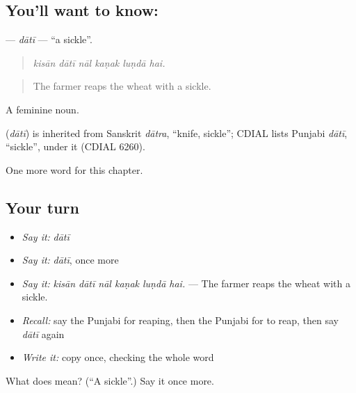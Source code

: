 \subsection*{You'll want to know: }
\textbf{} — \emph{dātī} — \textquotedblleft{}a sickle\textquotedblright{}.

\begin{quote}
     
\end{quote}

\begin{quote}
\emph{kisān dātī nāl kaṇak luṇdā hai.}
\end{quote}

\begin{quote}
The farmer reaps the wheat with a sickle.
\end{quote}

A feminine noun.

\begin{cousinweb}
\textbf{} (\emph{dātī}) is inherited from Sanskrit \emph{dātra}, \textquotedblleft{}knife, sickle\textquotedblright{}; CDIAL lists Punjabi \emph{dātī}, \textquotedblleft{}sickle\textquotedblright{}, under it (CDIAL 6260).
\end{cousinweb}

\begin{grammarlens}[title={What you've built}]
One more word for this chapter.
\end{grammarlens}

\subsection*{Your turn}
\begin{itemize}
\raggedright
  \item \emph{Say it:} \emph{dātī}
  \item \emph{Say it:} \emph{dātī}, once more
  \item \emph{Say it:} \emph{kisān dātī nāl kaṇak luṇdā hai.} — The farmer reaps the wheat with a sickle.
  \item \emph{Recall:} say the Punjabi for reaping, then the Punjabi for to reap, then say \emph{dātī} again
  \item \emph{Write it:} copy \textbf{} once, checking the whole word
\end{itemize}

\begin{tcolorbox}[breakable,colback=teal!4,colframe=teal!35!black,title={Before you move on}]
What does  mean? (\textquotedblleft{}A sickle\textquotedblright{}.) Say it once more.
\end{tcolorbox}
